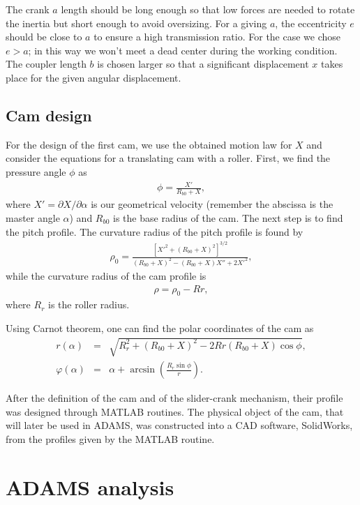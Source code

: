 \documentclass[12pt]{scrartcl}
\begin{document}
The crank $a$ length should be long enough so that low forces are needed to rotate the inertia but short enough to avoid oversizing. For a giving $a$, the eccentricity $e$ should be close to $a$ to ensure a high transmission ratio. For the case we chose $e>a$; in this way we won't meet a dead center during the working condition. The coupler length $b$ is chosen larger so that a significant displacement $x$ takes place for the given angular displacement.

\subsection{Cam design}
For the design of the first cam, we use the obtained motion law for $X$ and consider the equations for a translating cam with a roller. First, we find the pressure angle $\phi$ as
\begin{eqnarray}
	\phi = \frac{X'}{R_{b0} + X},
\end{eqnarray}
where $X' = \partial X /\partial \alpha$ is our geometrical velocity (remember the abscissa is the master angle $\alpha$) and $R_{b0}$ is the base radius of the cam. The next step is to find the pitch profile. The curvature radius of the pitch profile is found by 
\begin{eqnarray}
	\rho_0 = \frac{\left[X'^2+ (R_{b0} + X)^2\right]^{3/2}}{(R_{b0} + X)^2 - (R_{b0} + X)X'' + 2X'^2},
\end{eqnarray}
while the curvature radius of the cam profile is 
\begin{eqnarray}
	\rho = \rho_0 - Rr,
\end{eqnarray}
where $R_r$ is the roller radius.

 Using Carnot theorem, one can find the polar coordinates of the cam as
\begin{eqnarray}
	r(\alpha) &=& \sqrt{R_r^2+ (R_{b0}+ X)^2- 2Rr(R_{b0} + X)\cos \phi},\\
	\varphi(\alpha) &=& \alpha + \arcsin \left(\frac{R_r \sin \phi}{r}\right).
	\label{exp: cam profile}
\end{eqnarray}

After the definition of the cam and of the slider-crank mechanism, their profile was designed through MATLAB routines. The physical object of the cam, that will later be used in ADAMS, was constructed into a CAD software, SolidWorks, from the profiles given by the MATLAB routine.

\section{ADAMS analysis}
\end{document}

